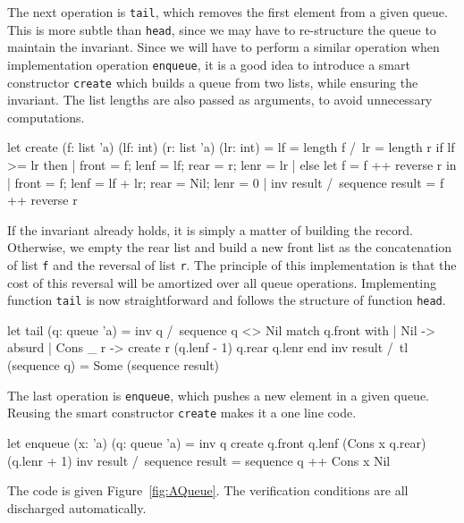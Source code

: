 The next operation is \texttt{tail}, which removes the first element
from a given queue. This is more subtle than \texttt{head}, since we
may have to re-structure the queue to maintain the invariant.
Since we will have to perform a similar operation when implementation
operation \texttt{enqueue}, it is a good idea to introduce a smart
constructor \texttt{create} which builds a queue from two lists, while
ensuring the invariant. The list lengths are also passed as arguments,
to avoid unnecessary computations.
\begin{whycode}
  let create (f: list 'a) (lf: int) (r: list 'a) (lr: int) =
    { lf = length f /\ lr = length r }
    if lf >= lr then
      {| front = f; lenf = lf; rear = r; lenr = lr |}
    else
      let f = f ++ reverse r in
      {| front = f; lenf = lf + lr; rear = Nil; lenr = 0 |}
    { inv result /\ sequence result = f ++ reverse r }
\end{whycode}
If the invariant already holds, it is simply a matter of building the
record. Otherwise, we empty the rear list and build a new front list
as the concatenation of list \texttt{f} and the reversal of list \texttt{r}.
The principle of this implementation is that the cost of this reversal
will be amortized over all queue operations. Implementing function
\texttt{tail} is now straightforward and follows the structure of
function \texttt{head}.
\begin{whycode}
  let tail (q: queue 'a) =
    { inv q /\ sequence q <> Nil }
    match q.front with
      | Nil      -> absurd
      | Cons _ r -> create r (q.lenf - 1) q.rear q.lenr
    end
    { inv result /\ tl (sequence q) = Some (sequence result) }
\end{whycode}
The last operation is \texttt{enqueue}, which pushes a new element in
a given queue. Reusing the smart constructor \texttt{create} makes it
a one line code.
\begin{whycode}
  let enqueue (x: 'a) (q: queue 'a) =
    { inv q }
    create q.front q.lenf (Cons x q.rear) (q.lenr + 1)
    { inv result /\ sequence result = sequence q ++ Cons x Nil }
\end{whycode}
The code is given Figure~\ref{fig:AQueue}. The verification conditions
are all discharged automatically.
